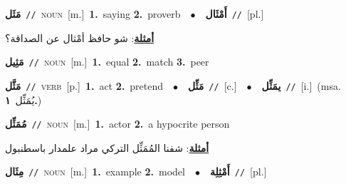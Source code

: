 \documentclass[10pt,a4paper,twoside]{article} %
\begin{document}
\begin{multicols}{2}
{\setlength\topsep{0pt}\textbf{\foreignlanguage{arabic}{مَثَل}}\ {\color{gray}\texttt{//}\color{black}}\ \textsc{noun}\ [m.]\ \textbf{1.}~saying  \textbf{2.}~proverb\ \ $\bullet$\ \ \setlength\topsep{0pt}\textbf{\foreignlanguage{arabic}{أَمْثَال}}\ {\color{gray}\texttt{//}\color{black}}\ [pl.]\  \begin{flushright}\color{gray}\foreignlanguage{arabic}{\textbf{\underline{\foreignlanguage{arabic}{أمثلة}}}: شو حافظ أمْثال عن الصداقة؟}\end{flushright}\color{black}} \vspace{2mm}

{\setlength\topsep{0pt}\textbf{\foreignlanguage{arabic}{مَثِيل}}\ {\color{gray}\texttt{//}\color{black}}\ \textsc{noun}\ [m.]\ \textbf{1.}~equal  \textbf{2.}~match  \textbf{3.}~peer\ } \vspace{2mm}

{\setlength\topsep{0pt}\textbf{\foreignlanguage{arabic}{مَثَّل}}\ {\color{gray}\texttt{//}\color{black}}\ \textsc{verb}\ [p.]\ \textbf{1.}~act  \textbf{2.}~pretend\ \ $\bullet$\ \ \setlength\topsep{0pt}\textbf{\foreignlanguage{arabic}{مَثِّل}}\ {\color{gray}\texttt{//}\color{black}}\ [c.]\ \ $\bullet$\ \ \setlength\topsep{0pt}\textbf{\foreignlanguage{arabic}{يمَثِّل}}\ {\color{gray}\texttt{//}\color{black}}\ [i.]\ \color{gray}(msa. \foreignlanguage{arabic}{يُمَثِّل}~\foreignlanguage{arabic}{\textbf{١.}})\color{black}\ } \vspace{2mm}

{\setlength\topsep{0pt}\textbf{\foreignlanguage{arabic}{مُمَثِّل}}\ {\color{gray}\texttt{//}\color{black}}\ \textsc{noun}\ [m.]\ \textbf{1.}~actor  \textbf{2.}~a hypocrite person\  \begin{flushright}\color{gray}\foreignlanguage{arabic}{\textbf{\underline{\foreignlanguage{arabic}{أمثلة}}}: شفنا المُمَثِّل التركي مراد علمدار باسطنبول}\end{flushright}\color{black}} \vspace{2mm}

{\setlength\topsep{0pt}\textbf{\foreignlanguage{arabic}{مِثَال}}\ {\color{gray}\texttt{//}\color{black}}\ \textsc{noun}\ [m.]\ \textbf{1.}~example  \textbf{2.}~model\ \ $\bullet$\ \ \setlength\topsep{0pt}\textbf{\foreignlanguage{arabic}{أَمْثِلِة}}\ {\color{gray}\texttt{//}\color{black}}\ [pl.]\ } \vspace{2mm}


\end{multicols}
\end{document}
